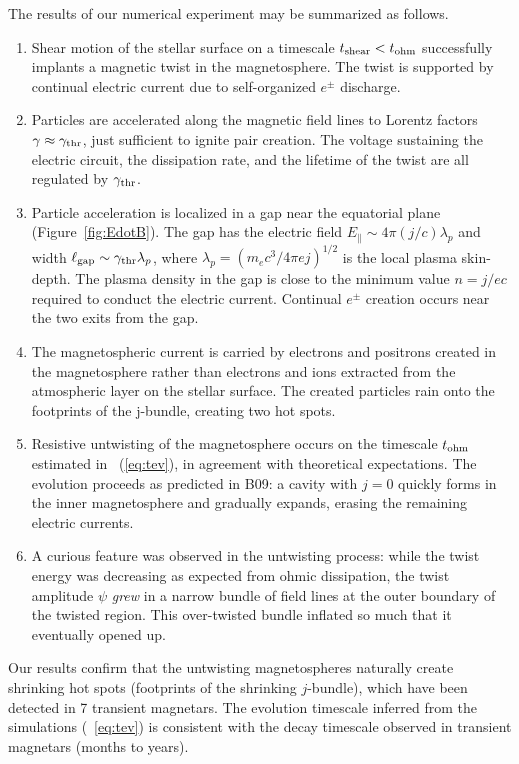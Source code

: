 The results of our numerical experiment may be summarized as follows.
\begin{enumerate}
\item Shear motion of the stellar surface on a timescale $t_{\rm shear}<t_{\rm ohm}$
successfully implants a magnetic twist in the magnetosphere.
The twist is supported by continual electric current due to
self-organized $e^\pm$ discharge.

\item Particles are accelerated along the magnetic field lines to Lorentz factors
$\gamma\approx\gamma_{\rm thr}$, just sufficient to ignite pair creation.
The voltage sustaining the electric circuit, the
dissipation rate, and the lifetime of the twist are all regulated by $\gamma_{\rm thr}$.

\item Particle acceleration is localized in a gap near the equatorial plane
(Figure~\ref{fig:EdotB}).
The gap has the electric field $E_\parallel\sim 4\pi (j/c)\lambda_p$ and width
$\ell_{\rm gap}\sim\gamma_{\rm thr}\lambda_p$, where $\lambda_p=(m_ec^3/4\pi e j)^{1/2}$ is the local
plasma skin-depth.
The plasma density in the gap is close to the minimum value $n=j/ec$ required to
conduct the electric current. Continual $e^\pm$ creation occurs near the two exits
from the gap.

\item The magnetospheric current is carried by electrons and positrons created
in the magnetosphere rather than electrons and ions extracted from the atmospheric
layer on the stellar surface. The created particles rain onto the footprints of the j-bundle,
creating two hot spots.

\item Resistive untwisting of the magnetosphere occurs on the timescale
$t_{\rm ohm}$
estimated in \Eq~(\ref{eq:tev}), in agreement with theoretical expectations.
The evolution proceeds as predicted in B09: a cavity with $j=0$ quickly forms in
the inner magnetosphere and gradually expands, erasing the remaining electric currents.

\item A curious feature was observed in the untwisting process: while the
twist energy was decreasing as expected from ohmic dissipation,
the twist amplitude $\psi$ {\it grew} in a narrow bundle of field lines at the outer
boundary of the twisted region. This over-twisted bundle inflated so much that it
eventually opened up.
\end{enumerate}

Our results confirm that the untwisting magnetospheres naturally create shrinking hot
spots (footprints of the shrinking $j$-bundle), which have been detected in 7 transient
magnetars. The evolution timescale inferred from the simulations (\Eq~\ref{eq:tev})
is consistent with the decay timescale observed in transient magnetars (months to years).

